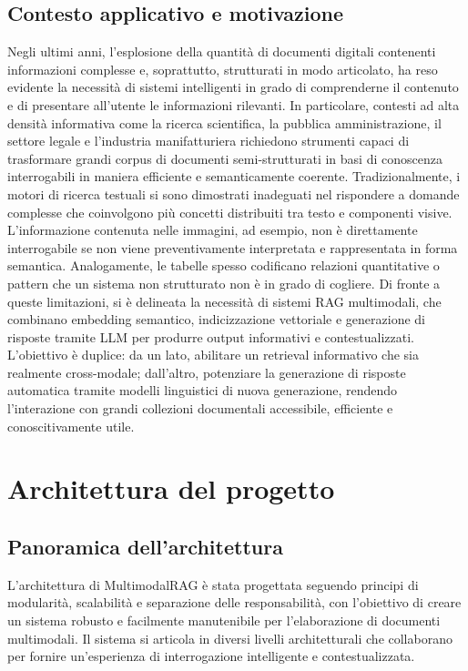 \subsection{Contesto applicativo e motivazione}
Negli ultimi anni, l'esplosione della quantità di documenti digitali contenenti informazioni complesse e, soprattutto, strutturati in modo articolato, ha reso evidente la necessità di sistemi intelligenti in grado di comprenderne il contenuto e di presentare all'utente le informazioni rilevanti. In particolare, contesti ad alta densità informativa come la ricerca scientifica, la pubblica amministrazione, il settore legale e l’industria manifatturiera richiedono strumenti capaci di trasformare grandi corpus di documenti semi-strutturati in basi di conoscenza interrogabili in maniera efficiente e semanticamente coerente.
Tradizionalmente, i motori di ricerca testuali si sono dimostrati inadeguati nel rispondere a domande complesse che coinvolgono più concetti distribuiti tra testo e componenti visive. L'informazione contenuta nelle immagini, ad esempio, non è direttamente interrogabile se non viene preventivamente interpretata e rappresentata in forma semantica. Analogamente, le tabelle spesso codificano relazioni quantitative o pattern che un sistema non strutturato non è in grado di cogliere. Di fronte a queste limitazioni, si è delineata la necessità di sistemi RAG multimodali, che combinano embedding semantico, indicizzazione vettoriale e generazione di risposte tramite LLM per produrre output informativi e contestualizzati. L’obiettivo è duplice: da un lato, abilitare un retrieval informativo che sia realmente cross-modale; dall’altro, potenziare la generazione di risposte automatica tramite modelli linguistici di nuova generazione, rendendo l’interazione con grandi collezioni documentali accessibile, efficiente e conoscitivamente utile.



\section{Architettura del progetto}

\subsection{Panoramica dell'architettura}
L'architettura di MultimodalRAG è stata progettata seguendo principi di modularità, scalabilità e separazione delle responsabilità, con l'obiettivo di creare un sistema robusto e facilmente manutenibile per l'elaborazione di documenti multimodali. Il sistema si articola in diversi livelli architetturali che collaborano per fornire un'esperienza di interrogazione intelligente e contestualizzata.

